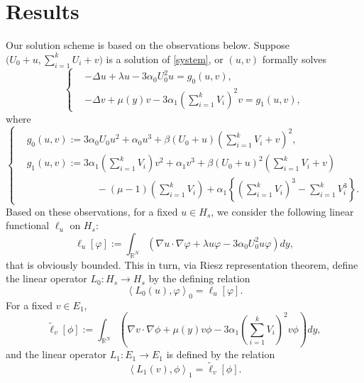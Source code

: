 \documentclass{amsart}
\theoremstyle{definition}
\theoremstyle{remark}
\numberwithin{equation}{section}
\begin{document}
\section{Results} \label{sec:result}
Our solution scheme is based on the observations below. Suppose $\Big(U_0 +u, \displaystyle \sum_{i=1}^k U_i + v\Big)$ is a solution of \eqref{system}, or $(u,v)$ formally solves
\begin{equation*}
 \left\{
 \begin{aligned}
 &-\Delta u + \lambda u - 3\alpha_0U_0^2 u =g_0(u,v),  \\
 &-\Delta v + \mu(y) v - 3\alpha_1\left(\sum_{i=1}^k V_{i}\right)^2 v =g_1(u,v),  
 \end{aligned}
 \right.
\end{equation*}
where
\begin{equation*}
 \left\{
 \begin{aligned}
 & g_0(u,v):=3\alpha_0U_{ {0}} u^2 + \alpha_0u^3 + \beta(U_0+u)\left(\sum_{i=1}^k V_{i} +v\right)^2,\\
 & g_1(u,v):= 3\alpha_1\left(\sum_{i=1}^k V_{i}\right)v^2 + \alpha_1v^3 + \beta\left(U_0 +u\right)^2\left(\sum_{i=1}^k V_{i} +v\right)  \\
 & \quad \quad \quad \quad \quad \quad \quad - (\mu-1)\left(\sum_{i=1}^k V_{i}\right)+ \alpha_1\left\{ \left(\sum_{i=1}^k V_{i}\right)^3 - \sum_{i=1}^k V_{i}^3 \right\}.
 \end{aligned}
 \right.
\end{equation*}
Based on these observations, for a fixed $u \in H_s$, we consider the following linear functional $\ell_u$ on $H_s$:
$$\ell_u[\varphi] := \int_{ \mathbb{R}^N}\left( \nabla u\cdot\nabla\varphi + \lambda u \varphi - 3\alpha_0 U_0^2 u\varphi\right)dy,$$
that is obviously bounded. This in turn, via Riesz representation theorem, define the linear operator $L_0: H_s\rightarrow H_s$ by the defining relation
\begin{equation}\label{l0}\left<L_0(u),\varphi\right>_0 = \ell_u[\varphi].\end{equation}
For a fixed $v \in E_1$,
$$\tilde\ell_v[\phi]:=\int_{ \mathbb{R}^N}\left( \nabla v\cdot\nabla\phi + \mu(y) v \phi - 3\alpha_1 \left(\sum_{i=1}^k V_{i}\right)^2 v\phi\right)dy,$$
and the linear operator $L_1: E_1 \rightarrow E_1$ is defined by the relation
\begin{equation}\label{l1}\left<L_1(v),\phi\right>_1 = \tilde\ell_v[\phi].\end{equation}
\end{document}
